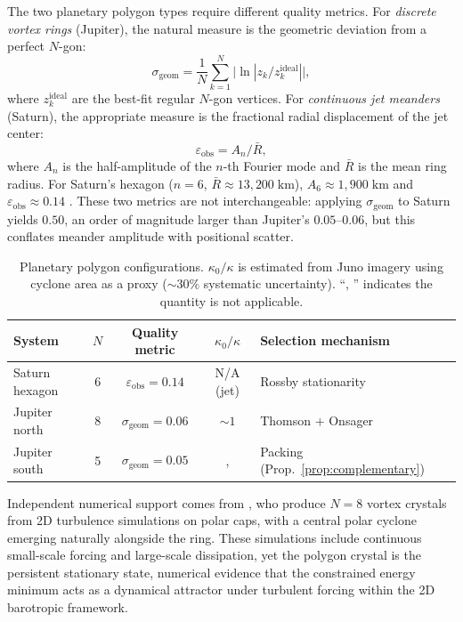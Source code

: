 The two planetary polygon types require different quality metrics.
For \emph{discrete vortex rings} (Jupiter), the natural measure is the
geometric deviation from a perfect $N$-gon:
\begin{equation}\label{eq:sigma-geom}
  \sigma_{\mathrm{geom}} = \frac{1}{N}\sum_{k=1}^{N}
  \bigl|\!\ln|z_k / z_k^{\mathrm{ideal}}|\bigr|,
\end{equation}
where $z_k^{\mathrm{ideal}}$ are the best-fit regular $N$-gon vertices.
For \emph{continuous jet meanders} (Saturn), the appropriate measure is
the fractional radial displacement of the jet center:
\begin{equation}\label{eq:eps-obs}
  \varepsilon_{\mathrm{obs}} = A_n / \bar{R},
\end{equation}
where $A_n$ is the half-amplitude of the $n$-th Fourier mode and
$\bar{R}$ is the mean ring radius.  For Saturn's hexagon
($n = 6$, $\bar{R} \approx 13{,}200\;\mathrm{km}$),
$A_6 \approx 1{,}900\;\mathrm{km}$ and
$\varepsilon_{\mathrm{obs}} \approx 0.14$
\citep{Godfrey1988, Antunano2015}.
These two metrics are not interchangeable: applying
$\sigma_{\mathrm{geom}}$ to Saturn yields $0.50$, an order of magnitude
larger than Jupiter's $0.05$--$0.06$, but this conflates meander
amplitude with positional scatter.

\begin{table}[htbp]
\centering
\caption{Planetary polygon configurations.
$\kappa_0/\kappa$ is estimated from Juno imagery \citep{Adriani2018}
using cyclone area as a proxy ($\sim\!30\%$ systematic uncertainty).
``, '' indicates the quantity is not applicable.}
\label{tab:planets}
\begin{tabular}{lcccl}
\toprule
System & $N$ & Quality metric &
  $\kappa_0/\kappa$ & Selection mechanism \\
\midrule
Saturn hexagon    & 6 & $\varepsilon_{\mathrm{obs}} = 0.14$ & N/A (jet) & Rossby stationarity \\
Jupiter north     & 8 & $\sigma_{\mathrm{geom}} = 0.06$ & $\sim\!1$ & Thomson + Onsager \\
Jupiter south     & 5 & $\sigma_{\mathrm{geom}} = 0.05$ &, & Packing (Prop.~\ref{prop:complementary}) \\
\bottomrule
\end{tabular}
\end{table}

\noindent
Independent numerical support comes from \citet{Siegelman2022}, who
produce $N = 8$ vortex crystals from 2D turbulence simulations
on polar caps, with a central polar cyclone emerging naturally
alongside the ring.  These simulations
include continuous small-scale forcing and large-scale dissipation, yet
the polygon crystal is the persistent stationary state, numerical
evidence that the constrained energy minimum acts as a dynamical
attractor under turbulent forcing within the 2D barotropic framework.


